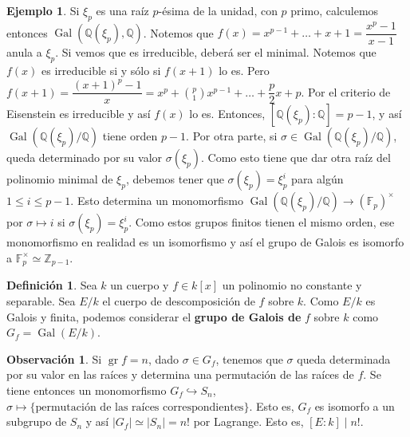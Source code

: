 \documentclass[12pt]{book}
\theoremstyle{definition}
\newtheorem{obs}[teo]{Observación}
\newtheorem{defn}[teo]{Definición}
\newtheorem{ex}[teo]{Ejemplo}
\newcommand{\ZZ}{\mathbb{Z}}      %
\newcommand{\QQ}{\mathbb{Q}}
\newcommand{\FF}{\mathbb{F}}
\DeclareMathOperator{\gr}{gr}
\DeclareMathOperator{\Gal}{Gal}
\begin{document}
\begin{ex}
Si $\xi_p$ es una raíz $p$-ésima de la unidad, con $p$ primo, calculemos entonces $\Gal(\QQ(\xi_p),\QQ)$. Notemos que $f(x)=x^{p-1} + \ldots + x+1 = \dfrac{x^p - 1}{x-1}$ anula a $\xi_p$. Si vemos que es irreducible, deberá ser el minimal. Notemos que $f(x)$ es irreducible si y sólo si $f(x+1)$ lo es. Pero $f(x+1) = \dfrac{(x+1)^p - 1}{x} = x^p + \binom{p}{1}x^{p-1}+\ldots + \dfrac{p}{2}x + p$. Por el criterio de Eisenstein es irreducible y así $f(x)$ lo es. Entonces, $[\QQ(\xi_p):\QQ]=p-1$, y así $\Gal(\QQ(\xi_p)/\QQ)$ tiene orden $p-1$. Por otra parte, si $\sigma\in\Gal(\QQ(\xi_p)/\QQ)$, queda determinado por su valor $\sigma(\xi_p)$. Como esto tiene que dar otra raíz del polinomio minimal de $\xi_p$, debemos tener que $\sigma(\xi_p)=\xi_p^i$ para algún $1\leq i \leq p-1$. Esto determina un monomorfismo $\Gal(\QQ(\xi_p)/\QQ)\to (\FF_p)^\times$ por $\sigma\mapsto i$ si $\sigma(\xi_p)=\xi_p^i$. Como estos grupos finitos tienen el mismo orden, ese monomorfismo en realidad es un isomorfismo y así el grupo de Galois es isomorfo a $\FF_p^\times \simeq \ZZ_{p-1}$.
\end{ex}

\begin{defn}
Sea $k$ un cuerpo y $f\in k[x]$ un polinomio no constante y separable. Sea $E/k$ el cuerpo de descomposición de $f$ sobre $k$. Como $E/k$ es Galois y finita, podemos considerar el \textbf{grupo de Galois de} $f$ sobre $k$ como $G_f = \Gal(E/k)$.
\end{defn}

\begin{obs}
Si $\gr f=n$, dado $\sigma\in G_f$, tenemos que $\sigma$ queda determinada por su valor en las raíces y determina una permutación de las raíces de $f$. Se tiene entonces un monomorfismo $G_f\hookrightarrow S_n$, $\sigma\mapsto \{\text{permutación de las raíces correspondientes}\}$. Esto es, $G_f$ es isomorfo a un subgrupo de $S_n$ y así $|G_f|\simeq |S_n| = n!$ por Lagrange. Esto es, $[E:k]\mid n!$.
\end{obs}
\end{document}
